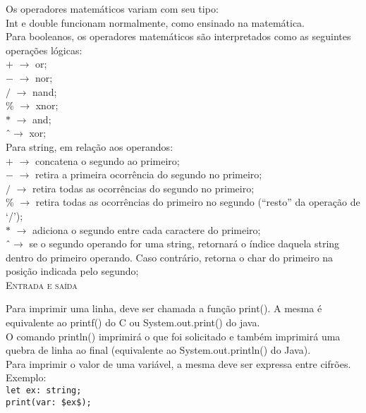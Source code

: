 \documentclass[12pt,a4paper]{article}
\begin{document}
Os operadores matemáticos variam com seu tipo:\\
Int e double funcionam normalmente, como ensinado na matemática.\\

Para booleanos, os operadores matemáticos são interpretados como as seguintes operações lógicas:\\[0.2cm]
$+$ $\rightarrow$ or;\\
$-$ $\rightarrow$ nor;\\
$/$ $\rightarrow$ nand;\\
\% $\rightarrow$ xnor;\\
$*$ $\rightarrow$ and;\\
\^ \ $\rightarrow$ xor;\\

Para string, em relação aos operandos:\\[0.15cm]
$+$ $\rightarrow$ concatena o segundo ao primeiro;\\
$-$ $\rightarrow$ retira a primeira ocorrência do segundo no primeiro;\\
$/$ $\rightarrow$ retira todas as ocorrências do segundo no primeiro;\\
\% $\rightarrow$ retira todas as ocorrências do primeiro no segundo (``resto'' da operação de `/');\\
$*$ $\rightarrow$ adiciona o segundo entre cada caractere do primeiro;\\
\^ \ $\rightarrow$ se o segundo operando for uma string, retornará o índice daquela string dentro do primeiro operando. Caso contrário, retorna o char do primeiro na posição indicada pelo segundo;\\[0.3cm]

\hypertarget{label1}{\Large{\textsc{Entrada e saída}}}\\
\normalsize

Para imprimir uma linha, deve ser chamada a função print(). A mesma é equivalente ao printf() do C ou System.out.print() do java.\\
O comando println() imprimirá o que foi solicitado e também imprimirá uma quebra de linha ao final (equivalente ao System.out.println() do Java).\\

Para imprimir o valor de uma variável, a mesma deve ser expressa entre cifrões. Exemplo: \\

\texttt{\noindent let ex: string;\\
\indent print(var: \$ex\$);} \\
\end{document}

